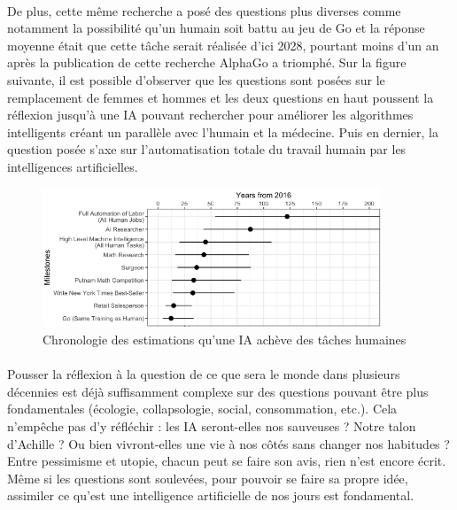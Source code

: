\documentclass[10pt, french, a4paper]{article}
\begin{document}
\paragraph{}
De plus, cette même recherche a posé des questions plus diverses comme notamment la possibilité qu’un humain soit battu au jeu de Go et la réponse moyenne était que cette tâche serait réalisée d’ici 2028, pourtant moins d’un an après la publication de cette recherche AlphaGo a triomphé. Sur la figure suivante, il est possible d’observer que les questions sont posées sur le remplacement de femmes et hommes et les deux questions en haut poussent la réflexion jusqu’à une IA pouvant rechercher pour améliorer les algorithmes intelligents créant un parallèle avec l’humain et la médecine. Puis en dernier, la question posée s’axe sur l’automatisation totale du travail humain par les intelligences artificielles.

\begin{figure}[hbt!]
    \centering
    \includegraphics[width=0.9\textwidth]{images/grace_2017_chrono_estim_ia.png}
    \caption{Chronologie des estimations qu’une IA achève des tâches humaines \citep{grace_when_2017}}
    \label{fig:chrono_estim_ia}
\end{figure}

\paragraph{}
Pousser la réflexion à la question de ce que sera le monde dans plusieurs décennies est déjà suffisamment complexe sur des questions pouvant être plus fondamentales (écologie, collapsologie, social, consommation, etc.). Cela n’empêche pas d’y réfléchir : les IA seront-elles nos sauveuses ? Notre talon d’Achille ? Ou bien vivront-elles une vie à nos côtés sans changer nos habitudes ? Entre pessimisme et utopie, chacun peut se faire son avis, rien n’est encore écrit. Même si les questions sont soulevées, pour pouvoir se faire sa propre idée, assimiler ce qu'est une intelligence artificielle de nos jours est fondamental.
\end{document}
